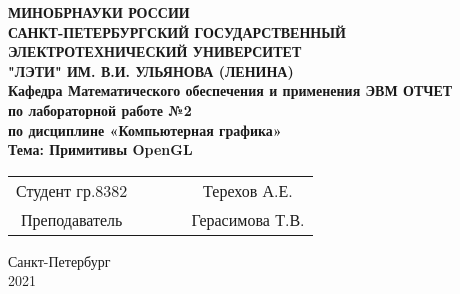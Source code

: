 \begin{titlepage}

\begin{center}
\textbf{
МИНОБРНАУКИ РОССИИ \\
САНКТ-ПЕТЕРБУРГСКИЙ ГОСУДАРСТВЕННЫЙ \\
ЭЛЕКТРОТЕХНИЧЕСКИЙ УНИВЕРСИТЕТ \\
"ЛЭТИ" ИМ. В.И. УЛЬЯНОВА (ЛЕНИНА) \\
Кафедра Математического обеспечения и применения ЭВМ
\vfill
ОТЧЕТ\\
по лабораторной работе №2\\
по дисциплине «Компьютерная графика»\\
Тема: Примитивы OpenGL
\vfill
}
\begin{tabular}{ c c c c c }
 Студент гр.8382 & \hspace{3cm} & \underline{\hspace{4cm}} & \hspace{1cm} & Терехов А.Е. \\
 Преподаватель & \hspace{3cm} & \underline{\hspace{4cm}} & \hspace{1cm} & Герасимова Т.В.
\end{tabular}

\vspace{3cm}

Санкт-Петербург\\
2021
\end{center}

\end{titlepage}
